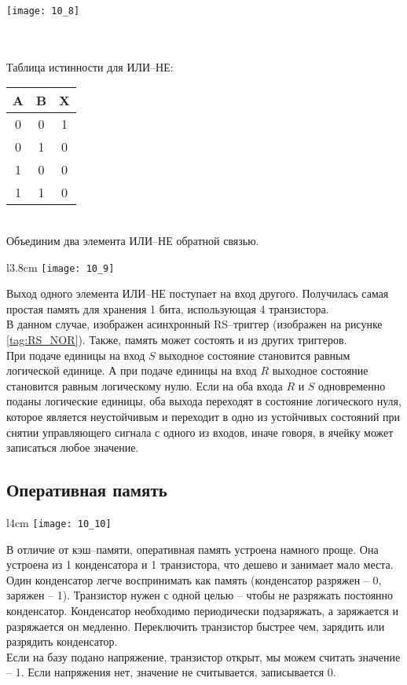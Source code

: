 \begin{minipage}[l]{4cm}
\texttt{[image: 10\_8]}
\end{minipage}
\\
\\Таблица истинности для ИЛИ--НЕ:
\begin{table}[!h]
\begin{tabular}{|c|c|c|}
\hline
A & B & X \\
\hline
 0 & 0 & 1 \\
 0 & 1 & 0 \\
 1 & 0 & 0 \\
 1 & 1 & 0 \\
\hline
\end{tabular}
\end{table}
\\Объединим два элемента ИЛИ--НЕ обратной связью.
\begin{wrapfigure}[10]{l}{3.8cm}
\texttt{[image: 10\_9]}
\end{wrapfigure}
Выход одного элемента ИЛИ--НЕ поступает на вход другого. Получилась самая простая память для хранения 1 бита, использующая 4 транзистора.
\\В данном случае, изображен асинхронный RS--триггер (изображен на рисунке \ref{tag:RS_NOR}). Также, память может состоять и из других триггеров.
\\При подаче единицы на вход $S$ выходное состояние становится равным логической единице. А при подаче единицы на вход $R$ выходное состояние становится равным логическому нулю. Если на оба входа $R$ и $S$ одновременно поданы логические единицы, оба выхода переходят в состояние логического нуля, которое является неустойчивым и переходит в одно из устойчивых состояний при снятии управляющего сигнала с одного из входов, иначе говоря, в ячейку может записаться любое значение.
\subsection{Оперативная память}
\begin{wrapfigure}[10]{l}{4cm}
\texttt{[image: 10\_10]}
\end{wrapfigure}
В отличие от кэш--памяти, оперативная память устроена намного проще. Она устроена из 1 конденсатора и 1 транзистора, что дешево и занимает мало места. Один конденсатор легче воспринимать как память (конденсатор разряжен -- 0, заряжен -- 1). Транзистор нужен с одной целью -- чтобы не разряжать постоянно конденсатор. Конденсатор необходимо периодически подзаряжать, а заряжается и разряжается он медленно. Переключить транзистор быстрее чем, зарядить или разрядить конденсатор.
\\Если на базу подано напряжение, транзистор открыт, мы можем считать значение -- 1. Если напряжения нет, значение не считывается, записывается 0.

